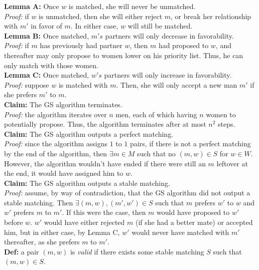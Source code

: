 \documentclass[12pt]{article}
\begin{document}
\textbf{Lemma A: }Once $w$ is matched, she will never be unmatched.\\
\emph{Proof: }if $w$ is unmatched, then she will either reject $m$, or break her relationship with $m'$ in favor of $m$. In either case, $w$ will still be matched.\\

\textbf{Lemma B: }Once matched, $m's$ partners will only decrease in favorability.\\
\emph{Proof: }if $m$ has previously had partner $w$, then $m$ had proposed to $w$, and thereafter may only propose to women lower on his priority list. Thus, he can only match with those women.\\

\textbf{Lemma C: }Once matched, $w's$ partners will only increase in favorability.\\
\emph{Proof: }suppose $w$ is matched with $m$. Then, she will only accept a new man $m'$ if she prefers $m'$ to $m$.\\

\textbf{Claim: }The GS algorithm terminates.\\
\emph{Proof:} the algorithm iterates over $n$ men, each of which having $n$ women to potentially propose. Thus, the algorithm terminates after at most $n^2$ steps.\\

\textbf{Claim: }The GS algorithm outputs a perfect matching.\\
\emph{Proof: }since the algorithm assigns $1$ to $1$ pairs, if there is not a perfect matching by the end of the algorithm, then $\exists m \in M$ such that no $(m, w) \in S$ for $w \in W$. However, the algorithm wouldn't have ended if there were still an $m$ leftover at the end, it would have assigned him to $w$. \\

\textbf{Claim: }The GS algorithm outputs a stable matching.\\
\emph{Proof: }assume, by way of contradiction, that the GS algorithm did not output a stable matching. Then $\exists (m, w), (m', w') \in S$ such that $m$ prefers $w'$ to $w$ and $w'$ prefers $m$ to $m'$. If this were the case, then $m$ would have proposed to $w'$ before $w$. $w'$ would have either rejected $m$ (if she had a better mate) or accepted him, but in either case, by Lemma C, $w'$ would never have matched with $m'$ thereafter, as she prefers $m$ to $m'$.\\

\textbf{Def: }a pair $(m, w)$ is \emph{valid} if there exists some stable matching $S$ such that $(m, w) \in S$.\\
\end{document}

